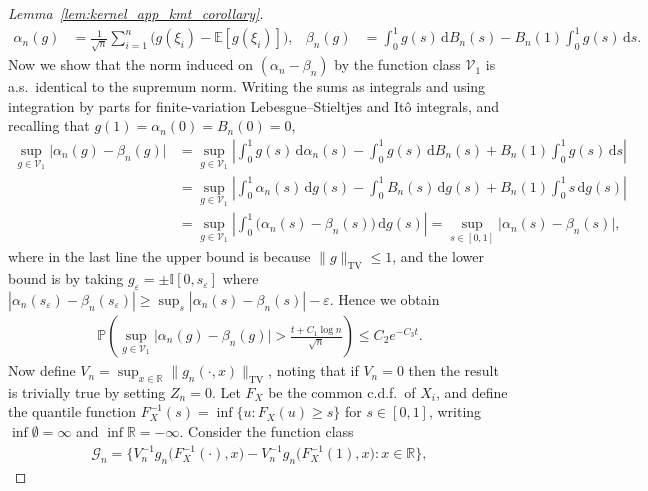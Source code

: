 \documentclass[11pt,lof]{puthesis}
\renewcommand{\P}{\ensuremath{\mathbb{P}}}
\newcommand{\R}{\ensuremath{\mathbb{R}}}
\newcommand{\E}{\ensuremath{\mathbb{E}}}
\newcommand{\I}{\ensuremath{\mathbb{I}}}
\newcommand{\TV}{\mathrm{TV}}
\newcommand{\cG}{\ensuremath{\mathcal{G}}}
\newcommand{\cV}{\ensuremath{\mathcal{V}}}
\newcommand{\diff}[1]{\,\mathrm{d}#1}
\theoremstyle{break}
\theoremstyle{proof}
\newtheorem{proof}{Proof}
\begin{document}
\begin{proof}[Lemma~\ref{lem:kernel_app_kmt_corollary}]
  \begin{align*}
    \alpha_n(g)
    &=
    \frac{1}{\sqrt{n}}
    \sum_{i=1}^n
    \big( g(\xi_i) - \E[g(\xi_i)]),
    &\beta_n(g)
    &= \int_0^1 g(s) \diff{B_n(s)}
    - B_n(1) \int_0^1 g(s) \diff{s}.
  \end{align*}
  Now we show that the norm induced on
  $(\alpha_n - \beta_n)$
  by the function class $\cV_1$ is a.s.\ identical to the
  supremum norm.
  Writing the sums as integrals and using integration by parts
  for finite-variation Lebesgue--Stieltjes and It\^o integrals,
  and recalling that $g(1) = \alpha_n(0) = B_n(0) = 0$,
  \begin{align*}
    \sup_{g \in \cV_1}
    \big|\alpha_n(g) - \beta_n(g)\big|
    &=
    \sup_{g \in \cV_1}
    \left|
      \int_0^1 g(s) \diff{\alpha_n(s)}
      - \int_0^1 g(s) \diff{B_n(s)}
      + B_n(1) \int_0^1 g(s) \diff{s}
    \right| \\
    &=
    \sup_{g \in \cV_1}
    \left|
      \int_0^1 \alpha_n(s) \diff{g(s)}
      - \int_0^1 B_n(s) \diff{g(s)}
      + B_n(1) \int_0^1 s \diff{g(s)}
    \right| \\
    &=
    \sup_{g \in \cV_1}
    \left|
      \int_0^1 \big(\alpha_n(s) - \beta_n(s)\big)
      \diff{g(s)}
    \right|
    = \sup_{s \in [0,1]}
    \big|
    \alpha_n(s) - \beta_n(s)
    \big|,
  \end{align*}
  where in the last line
  the upper bound is because $\|g\|_\TV \leq 1$,
  and the lower bound is by taking
  $g_\varepsilon = \pm \I[0,s_\varepsilon]$ where
  $|\alpha_n(s_\varepsilon) - \beta_n(s_\varepsilon)|
  \geq \sup_s |\alpha_n(s) - \beta_n(s)| -
  \varepsilon$.
  Hence we obtain
  \begin{align}
    \label{eq:kernel_app_kmt_concentration}
    \P\left(
      \sup_{g \in \cV_1}
      \big|\alpha_n(g) - \beta_n(g)\big|
      > \frac{t + C_1\log n}{\sqrt{n}}
    \right)
    \leq C_2 e^{-C_3 t}.
  \end{align}
  Now define $V_n = \sup_{x \in \R} \|g_n(\cdot, x)\|_\TV$,
  noting that if $V_n = 0$ then the result is trivially true
  by setting $Z_n = 0$.
  Let $F_X$ be the common c.d.f.\ of $X_i$,
  and define the quantile function
  $F_X^{-1}(s) = \inf \{u: F_X(u) \geq s\}$ for $s \in [0,1]$,
  writing $\inf \emptyset = \infty$
  and $\inf \R = -\infty$.
  Consider the function class
  \begin{align*}
    \cG_n = \big\{
      V_n^{-1} g_n\big(F_X^{-1}(\cdot), x\big)
      - V_n^{-1} g_n\big(F_X^{-1}(1), x\big)
    : x \in \R \big\},

\end{align*}
\end{proof}
\end{document}

